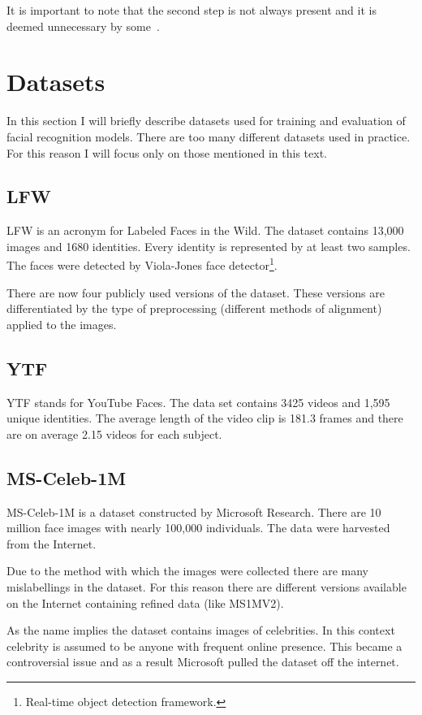 It is important to note that the second step is not always present and it is deemed unnecessary by some~\cite{FaceNet}.

\section{Datasets}\label{sec:datasets}
In this section I will briefly describe datasets used for training and evaluation of facial recognition models.
There are too many different datasets used in practice.
For this reason I will focus only on those mentioned in this text.

\subsection{LFW}\label{subsec:lfw}
LFW is an acronym for Labeled Faces in the Wild.
The dataset contains 13,000 images and 1680 identities.
Every identity is represented by at least two samples.
The faces were detected by Viola-Jones face detector\footnote{Real-time object detection framework.}.

There are now four publicly used versions of the dataset.
These versions are differentiated by the type of preprocessing (different methods of alignment) applied to the images.

\subsection{YTF}\label{subsec:ytf}
YTF stands for YouTube Faces.
The data set contains 3425 videos and 1,595 unique identities.
The average length of the video clip is 181.3 frames and there are on average 2.15 videos for each subject.

\subsection{MS-Celeb-1M}\label{subsec:ms1m}
MS-Celeb-1M is a dataset constructed by Microsoft Research.
There are 10 million face images with nearly 100,000 individuals.
The data were harvested from the Internet.

Due to the method with which the images were collected there are many mislabellings in the dataset.
For this reason there are different versions available on the Internet containing refined data (like MS1MV2).

As the name implies the dataset contains images of celebrities.
In this context celebrity is assumed to be anyone with frequent online presence.
This became a controversial issue and as a result Microsoft pulled the dataset off the internet.



